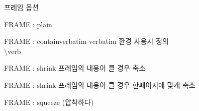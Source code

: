 \documentclass[9pt,blue,xcolor=pdftex,dvipsnames,table,handout,notes]{beamer}
\begin{document}








		\begin{frame}[t]{프레임 옵션}

			\begin{block} {FRAME : plain}
			\end{block}

			\begin{block} {FRAME : containverbatim}
			verbatim 환경 사용시 정의\\
			\textbackslash verb	
			\end{block}


			\begin{block} {FRAME : shrink}
			프레임의 내용이 클 경우 축소
			\end{block}

			\begin{block} {FRAME : shrink}
			프레임의 내용이 클 경우 한페이지에 맞게 축소
			\end{block}

			\begin{block} {FRAME : squeeze (압착하다) }

			\end{block}

		\end{frame}




\end{document}
